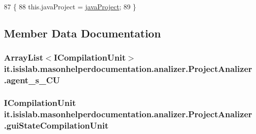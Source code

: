 \begin{DoxyCode}
87                                                          \{
88         this.javaProject = \hyperlink{classit_1_1isislab_1_1masonhelperdocumentation_1_1analizer_1_1_project_analizer_a8df706a1af9fdd057124a0e0d13a675d}{javaProject};
89     \}
\end{DoxyCode}


\subsection{Member Data Documentation}
\hypertarget{classit_1_1isislab_1_1masonhelperdocumentation_1_1analizer_1_1_project_analizer_ad495cee63b37e3bf36c81ccf896f9ce2}{
\subsubsection[{agent\-\_\-s\-\_\-\-C\-U}]{\setlength{\rightskip}{0pt plus 5cm}Array\-List$<$I\-Compilation\-Unit$>$ it.\-isislab.\-masonhelperdocumentation.\-analizer.\-Project\-Analizer.\-agent\-\_\-s\-\_\-\-C\-U\hspace{0.3cm}{\ttfamily [private]}}}\label{classit_1_1isislab_1_1masonhelperdocumentation_1_1analizer_1_1_project_analizer_ad495cee63b37e3bf36c81ccf896f9ce2}
\hypertarget{classit_1_1isislab_1_1masonhelperdocumentation_1_1analizer_1_1_project_analizer_a8e78e7052513210efe689d569da31826}{
\subsubsection[{gui\-State\-Compilation\-Unit}]{\setlength{\rightskip}{0pt plus 5cm}I\-Compilation\-Unit it.\-isislab.\-masonhelperdocumentation.\-analizer.\-Project\-Analizer.\-gui\-State\-Compilation\-Unit\hspace{0.3cm}{\ttfamily [private]}}}\label{classit_1_1isislab_1_1masonhelperdocumentation_1_1analizer_1_1_project_analizer_a8e78e7052513210efe689d569da31826}
